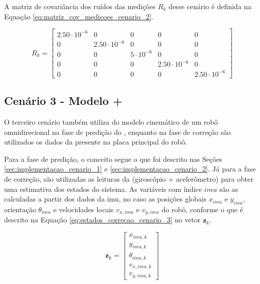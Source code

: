 \documentclass[acronym, symbols, table, deposito]{fei}
\begin{document}
			A matriz de covariância dos ruídos das medições $R_{k}$ desse cenário é definida na Equação \eqref{eq:matriz_cov_medicoes_cenario_2}.
			
			\begin{equation}\label{eq:matriz_cov_medicoes_cenario_2}
				R_{k} = \begin{bmatrix}
					2.50\cdot10^{-6} & 0 & 0 & 0 & 0 \\
					0 & 2.50\cdot10^{-6} & 0 & 0 & 0 \\
					0 & 0 & 5\cdot10^{-6} & 0 & 0 \\
					0 & 0 & 0 & 2.50\cdot10^{-6} & 0 \\
					0 & 0 & 0 & 0 & 2.50\cdot10^{-6}
				\end{bmatrix}
			\end{equation}
		
		\subsection{Cenário 3 - Modelo + } \label{sec:implementacao_cenario_3}
		
			O terceiro cenário também utiliza do modelo cinemático de um robô omnidirecional na fase de predição do , enquanto na fase de correção são utilizados os dados da  presente na placa principal do robô.
			
			Para a fase de predição, o conceito segue o que foi descrito nas Seções \ref{sec:implementacao_cenario_1} e \ref{sec:implementacao_cenario_2}. Já para a fase de correção, são utilizadas as leituras da  (giroscópio + acelerômetro) para obter uma estimativa dos estados do sistema. As variáveis com índice $imu$ são as calculadas a partir dos dados da \acrshort{imu}, no caso as posições globais $x_{imu}$ e $y_{imu}$, orientação $\theta_{imu}$ e velocidades locais $v_{x,imu}$ e $v_{y,imu}$ do robô, conforme o que é descrito na Equação \eqref{eq:estados_correcao_cenario_3} no vetor $\textbf{z}_k$.
			
	 		\begin{equation}\label{eq:estados_correcao_cenario_3}
				\textbf{z}_k  = 
				\begin{bmatrix}
					x_{imu,k} \\
					y_{imu,k} \\
					\theta_{imu,k} \\
					v_{x,imu,k} \\
					v_{y,imu,k}
				\end{bmatrix}
			\end{equation}
		
\end{document}

